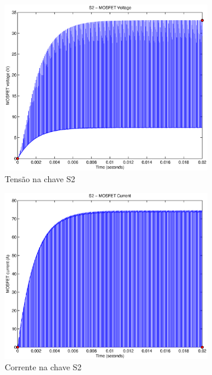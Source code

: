 \documentclass{article}
\begin{document}
\begin{figure}[H]
	\centering
	\begin{subfigure}[b]{0.4\linewidth}
		\includegraphics[width=\linewidth]{matlab/boost/r_s2v}
		\caption{Tensão na chave S2}
	\end{subfigure}
	\begin{subfigure}[b]{0.4\linewidth}
		\centering
		\includegraphics[width=\linewidth]{matlab/boost/r_s2i}
		\caption{Corrente na chave S2}
	\end{subfigure}
	\begin{subfigure}[b]{0.4\linewidth}

\end{subfigure}
\end{figure}
\end{document}
